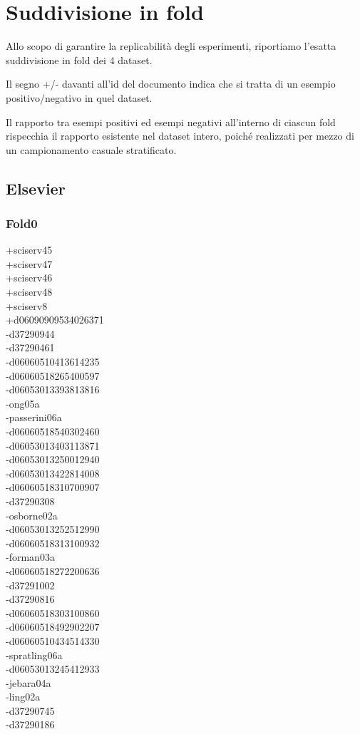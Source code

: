 \section{Suddivisione in fold}
\label{appendix:fold}
Allo scopo di garantire la replicabilità degli esperimenti, riportiamo l'esatta suddivisione in fold dei 4 dataset.

Il segno +/- davanti all'id del documento indica che si tratta di un esempio positivo/negativo in quel dataset.

Il rapporto tra esempi positivi ed esempi negativi all'interno di ciascun fold rispecchia il rapporto esistente nel dataset intero, poiché realizzati per mezzo di un campionamento casuale stratificato.

\scriptsize
\begin{multicols}{4}
\subsection{Elsevier}
\vspace{.5cm}

\subsubsection*{Fold0}
+sciserv45\\
+sciserv47\\
+sciserv46\\
+sciserv48\\
+sciserv8\\
+d06090909534026371\\
-d37290944\\
-d37290461\\
-d06060510413614235\\
-d06060518265400597\\
-d06053013393813816\\
-ong05a\\
-passerini06a\\
-d06060518540302460\\
-d06053013403113871\\
-d06053013250012940\\
-d06053013422814008\\
-d06060518310700907\\
-d37290308\\
-osborne02a\\
-d06053013252512990\\
-d06060518313100932\\
-forman03a\\
-d06060518272200636\\
-d37291002\\
-d37290816\\
-d06060518303100860\\
-d06060518492902207\\
-d06060510434514330\\
-spratling06a\\
-d06053013245412933\\
-jebara04a\\
-ling02a\\
-d37290745\\
-d37290186\\

\end{multicols}
